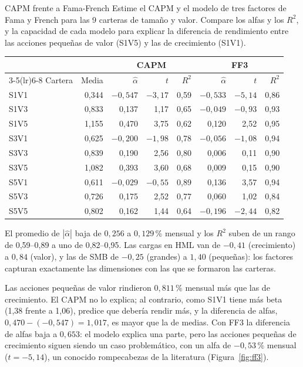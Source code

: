 \begin{ejresuelto}{CAPM frente a Fama-French}\label{ej:ff3}
\enunciado Estime el CAPM y el modelo de tres factores de Fama y French para las 9 carteras de tamaño y valor.
Compare los alfas y los $R^2$, y la capacidad de cada modelo para explicar la diferencia de rendimiento entre las
acciones pequeñas de valor (S1V5) y las de crecimiento (S1V1).

\solucion
{}
\begin{center}\small
\begin{tabular}{@{}lrrrrrrr@{}}
\toprule
 & & \multicolumn{3}{c}{CAPM} & \multicolumn{3}{c}{FF3} \\
\cmidrule(lr){3-5}\cmidrule(lr){6-8}
Cartera & Media & $\hat\alpha$ & $t$ & $R^2$ & $\hat\alpha$ & $t$ & $R^2$ \\
\midrule
S1V1 & 0,344 & $-0{,}547$ & $-3{,}17$ & 0,59 & $-0{,}533$ & $-5{,}14$ & 0,86 \\
S1V3 & 0,833 & 0,137 & 1,17 & 0,65 & $-0{,}049$ & $-0{,}93$ & 0,93 \\
S1V5 & 1,155 & 0,470 & 3,75 & 0,62 & 0,120 & 2,52 & 0,95 \\
S3V1 & 0,625 & $-0{,}200$ & $-1{,}98$ & 0,78 & $-0{,}056$ & $-1{,}08$ & 0,94 \\
S3V3 & 0,839 & 0,190 & 2,56 & 0,80 & 0,006 & 0,11 & 0,90 \\
S3V5 & 1,082 & 0,393 & 3,60 & 0,68 & 0,009 & 0,15 & 0,90 \\
S5V1 & 0,611 & $-0{,}029$ & $-0{,}55$ & 0,89 & 0,136 & 3,57 & 0,94 \\
S5V3 & 0,726 & 0,175 & 2,52 & 0,77 & 0,060 & 1,02 & 0,84 \\
S5V5 & 0,802 & 0,162 & 1,44 & 0,64 & $-0{,}196$ & $-2{,}44$ & 0,82 \\
\bottomrule
\end{tabular}
\end{center}
El promedio de $|\hat\alpha|$ baja de $0{,}256$ a $0{,}129$\,\% mensual y los $R^2$ suben de un rango de 0,59--0,89 a uno de
0,82--0,95. Las cargas en HML van de $-0{,}41$ (crecimiento) a $0{,}84$ (valor), y las de SMB de $-0{,}25$ (grandes) a $1{,}40$
(pequeñas): los factores capturan exactamente las dimensiones con las que se formaron las carteras.

 Las acciones pequeñas de valor rindieron $0{,}811$\,\% mensual más que las de
crecimiento. El CAPM no lo explica; al contrario, como S1V1 tiene más beta (1,38 frente a 1,06), predice que debería rendir
más, y la diferencia de alfas, $0{,}470-(-0{,}547)=1{,}017$, es mayor que la de medias. Con FF3 la diferencia de alfas baja a
$0{,}653$: el modelo explica una parte, pero las acciones pequeñas de crecimiento siguen siendo un caso problemático, con un
alfa de $-0{,}53$\,\% mensual ($t=-5{,}14$), un conocido rompecabezas de la literatura (Figura~\ref{fig:ff3}).


\end{ejresuelto}

